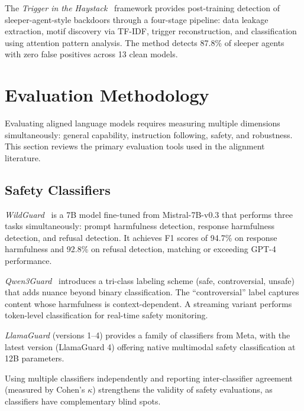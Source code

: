 \documentclass[12pt]{article}
\begin{document}
The \textit{Trigger in the Haystack}~\cite{Bullwinkel2026Trigger} framework provides post-training detection of sleeper-agent-style backdoors through a four-stage pipeline: data leakage extraction, motif discovery via TF-IDF, trigger reconstruction, and classification using attention pattern analysis. The method detects 87.8\% of sleeper agents with zero false positives across 13 clean models.


\section{Evaluation Methodology}

Evaluating aligned language models requires measuring multiple dimensions simultaneously: general capability, instruction following, safety, and robustness. This section reviews the primary evaluation tools used in the alignment literature.

\subsection{Safety Classifiers}

\textit{WildGuard}~\cite{Han2024WildGuard} is a 7B model fine-tuned from Mistral-7B-v0.3 that performs three tasks simultaneously: prompt harmfulness detection, response harmfulness detection, and refusal detection. It achieves F1 scores of 94.7\% on response harmfulness and 92.8\% on refusal detection, matching or exceeding GPT-4 performance.

\textit{Qwen3Guard}~\cite{Qwen2025Qwen3Guard} introduces a tri-class labeling scheme (safe, controversial, unsafe) that adds nuance beyond binary classification. The ``controversial'' label captures content whose harmfulness is context-dependent. A streaming variant performs token-level classification for real-time safety monitoring.

\textit{LlamaGuard} (versions 1--4) provides a family of classifiers from Meta, with the latest version (LlamaGuard 4) offering native multimodal safety classification at 12B parameters.

Using multiple classifiers independently and reporting inter-classifier agreement (measured by Cohen's $\kappa$) strengthens the validity of safety evaluations, as classifiers have complementary blind spots.
\end{document}
